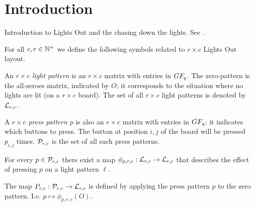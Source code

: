 \section{Introduction}

Introduction to Lights Out and the chasing down the lights. See \cite{martin012}.

\begin{definition}
  For all $c,r\in\mathbb{N}^{+}$ we define the following symbols related to
  $r \times c$ Lights Out layout.

  An {\it $r\times c$ light pattern} is an $r\times c$ matrix
  with entries in $GF_q$. The zero-pattern is the all-zeroes
  matrix, indicated by $O$; it corresponds to the situation
  where no lights are lit (on a $r\times c$ board).
  The set of all $r\times c$ light patterns is denoted by $\mathcal{L}_{r,c}$.

  A {\it $r\times c$ press pattern $p$} is also an $r\times c$ matrix
  with entries in $GF_q$; it indicates which buttons to press. The
  button at position $i, j$ of the board will be pressed $p_{i,j}$
  times. $\mathcal{P}_{r,c}$ is the set of all such press patterns.

  For every $p\in\mathcal{P}_{r,c}$ there exist a map $\phi_{p,r,c} : \mathcal{L}_{r,c}
  \rightarrow \mathcal{L}_{r,c}$ that describes the effect of pressing $p$ on
  a light pattern $\ell$.

  The map $P_{r,c} : \mathcal{P}_{r,c} \rightarrow \mathcal{L}_{r,c}$ is defined by
  applying the press pattern $p$ to the zero pattern. I.e.
  $p \mapsto \phi_{p,r,c}(O)$.
\end{definition}
